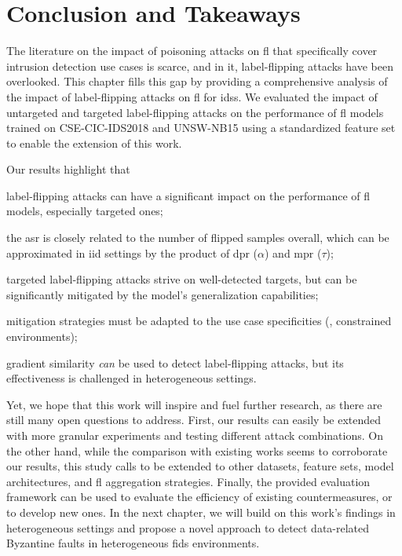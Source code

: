 \section{Conclusion and Takeaways\label{sec:assess.conclusion}}

The literature on the impact of poisoning attacks on \gls{fl} that specifically cover intrusion detection use cases is scarce, and in it, label-flipping attacks have been overlooked.
This chapter fills this gap by providing a comprehensive analysis of the impact of label-flipping attacks on \gls{fl} for \glspl{ids}.
We evaluated the impact of untargeted and targeted label-flipping attacks on the performance of \gls{fl} models trained on CSE-CIC-IDS2018 and UNSW-NB15 using a standardized feature set to enable the extension of this work.

Our results highlight that
\begin{enumerate*}[(i)]
  \item label-flipping attacks can have a significant impact on the performance of \gls{fl} models, especially targeted ones;
  \item the \gls{asr} is closely related to the number of flipped samples overall, which can be approximated in \gls{iid} settings by the product of \gls{dpr} ($\alpha$) and \gls{mpr} ($\tau$); 
  \item targeted label-flipping attacks strive on well-detected targets, but can be significantly mitigated by the model's generalization capabilities;
  \item mitigation strategies must be adapted to the use case specificities (\eg, constrained environments);
  \item gradient similarity \emph{can} be used to detect label-flipping attacks, but its effectiveness is challenged in heterogeneous settings.
\end{enumerate*}

Yet, we hope that this work will inspire and fuel further research, as there are still many open questions to address.
First, our results can easily be extended with more granular experiments and testing different attack combinations.
On the other hand, while the comparison with existing works seems to corroborate our results, this study calls to be extended to other datasets, feature sets, model architectures, and \gls{fl} aggregation strategies.
Finally, the provided evaluation framework can be used to evaluate the efficiency of existing countermeasures, or to develop new ones.
In the next chapter, we will build on this work's findings in heterogeneous settings and propose a novel approach to detect data-related Byzantine faults in heterogeneous \gls{fids} environments.


